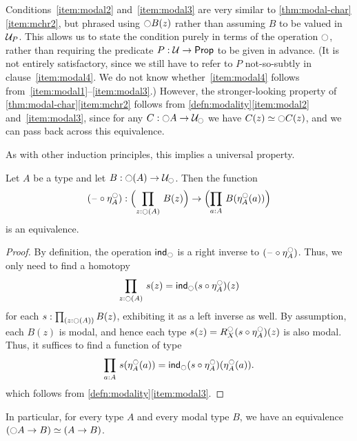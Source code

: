 Conditions~\ref{item:modal2} and~\ref{item:modal3} are very similar to \autoref{thm:modal-char}\ref{item:mchr2}, but phrased using $\modal B(z)$ rather than assuming $B$ to be valued in $\P$.
This allows us to state the condition purely in terms of the operation $\modal$, rather than requiring the predicate $P:\type\to\prop$ to be given in advance.
(It is not entirely satisfactory, since we still have to refer to $P$ not-so-subtly in clause~\ref{item:modal4}.
We do not know whether~\ref{item:modal4} follows from~\ref{item:modal1}--\ref{item:modal3}.)
However, the stronger-looking property of \autoref{thm:modal-char}\ref{item:mchr2} follows from \autoref{defn:modality}\ref{item:modal2} and~\ref{item:modal3}, since for any $C:\modal A \to \modaltype$ we have $C(z) \eqvsym \modal C(z)$, and we can pass back across this equivalence.

%
As with other induction principles, this implies a universal property.

\begin{thm}\label{prop:lv_n_deptype_sec_equiv_by_precomp}
Let $A$ be a type and let $B:\modal(A)\to\modaltype$. Then the function
\begin{equation*}
(\blank\circ \mreturn^\modal_A) : \Parens{\prd{z:\modal(A)}B(z)} \to \Parens{\prd{a:A}B(\mreturn^\modal_A(a))}
\end{equation*}
is an equivalence.
\end{thm}
\begin{proof}
By definition, the operation $\ind{\modal}$ is a right inverse to $(\blank\circ \mreturn^\modal_A)$.
Thus, we only need to find a homotopy
\begin{equation*}
\prd{z:\modal(A)}s(z)= \ind{\modal}(s\circ \mreturn^\modal_A)(z)
\end{equation*}
for each $s:\prd{z:\modal(A)}B(z)$, exhibiting it as a left inverse as well.
By assumption, each $B(z)$ is modal, and hence each type $s(z)= R^\modal_X(s\circ \mreturn^\modal_A)(z)$
is also modal.
Thus, it suffices to find a function of type
\begin{equation*}
\prd{a:A}s(\mreturn^\modal_A(a))= \ind{\modal}(s\circ \mreturn^\modal_A)(\mreturn^\modal_A(a)).
\end{equation*}
which follows from \autoref{defn:modality}\ref{item:modal3}.
\end{proof}

In particular, for every type $A$ and every modal type $B$, we have an equivalence $(\modal A\to B)\eqvsym (A\to B)$.

